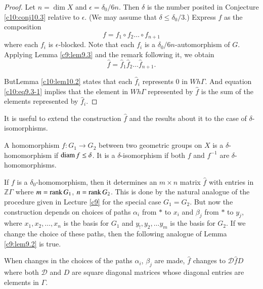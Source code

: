 \begin{proof}
  Let $n = \dim X$ and $\epsilon= \delta_0 /6n$. Then $\delta$ is the
  number posited in Conjecture \ref{c10:conj10.3} relative to
  $\epsilon$. (We may assume that $\delta \leq \delta_0/3$.) Express
  $f$ as the composition
  $$
  f=f_1 \circ f_2 \ldots \circ f_{n+1}
  $$
  where each $f_i$ is $\epsilon$-blocked. Note that each $f_i$ is a
  $\delta_0/6n$-automorphism of $G$. Applying Lemma \ref{c9:lem9.3}
  and the remark following it, we obtain
  \begin{equation*}
    \hat{f} = \hat{f}_1 \hat{f}_2 \ldots
    \hat{f}_{n+1}.\tag{1}\label{c10:eq9.3-1} 
  \end{equation*}


But\pageoriginale Lemma \ref{c10:lem10.2} states that each $\hat{f}_i$ represents 0
in $Wh\Gamma$. And equation \eqref{c10:eq9.3-1} implies that the element
in $Wh \Gamma$ represented by $\hat{f}$ is the sum of the elements
represented by $\hat{f}_i$. 
\end{proof}

It is useful to extend the construction $\hat{f}$ and the results
about it to the case of $\delta$-isomorphisms.

\begin{defi}\label{c10:defi10.5}
  A homomorphism $f: G_1 \to G_2$ between two geometric groups on $X$
  is a $\delta$-homomorphism if $\operatorname{diam} f \leq \delta$. It is a
  $\delta$-isomorphism if both $f$ and $f^{-1}$ are $\delta$-homomorphisms.
\end{defi}

If $f$ is a $\delta_0$-homomorphism, then it determines an $m \times
n$ matrix $\hat{f}$ with entries in $\mathbb{Z}\Gamma$ where $m = \operatorname{rank}
G_1$, $n = \operatorname{rank} G_2$. This is done by the natural analogue of the
procedure given in Lecture \ref{c9} for the special case
$G_1=G_2$. But now the construction depends on choices of paths
$\alpha_i$ from $*$ to $x_{i}$ and $\beta_{j}$ from $*$ to $y_j$, 
where $x_1, x_2, \ldots, x_n$ is the
basis for $G_1$ and $y_!, y_2, \ldots y_m$ is the basis for $G_2$. If
we change the choice of these paths, then the following analogue of
Lemma \ref{c9:lem9.2} is true.

\begin{lemma}\label{c10:lem10.6}
  When changes in the choices of the paths $\alpha_i$, $\beta_j$ are
  made, $\hat{f}$ changes to $\mathcal{D} \hat{f} D$ where both
  $\mathcal{D}$ and $D$ are square diagonal matrices whose
  diagonal entries are elements in $\Gamma$.
\end{lemma}

